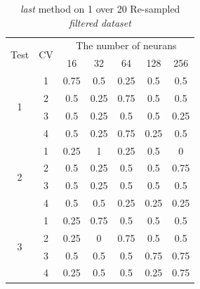 \documentclass[draft,dvipsnames]{drexel-thesis}
\begin{document}
\begin{thesis}
\begin{table}[!t]
\centering
\caption{{\em last} method on 1 over 20 Re-sampled {\em filtered dataset}}
\label{tbl:last_1_20}
\begin{tabular}{|c|c|c|c|c|c|c|}
\hline
\multirow{2}{*}{Test} & \multirow{2}{*}{CV} & \multicolumn{5}{c|}{The number of neurans}                             \\ \cline{3-7}
                      &                     & 16           & 32           & 64          & 128         & 256          \\ \hline
\multirow{4}{*}{1}    & 1                   & 0.75         & 0.5          & 0.25        & 0.5         & 0.5          \\ \cline{2-7}
                      & 2                   & 0.5          & 0.25         & 0.75        & 0.5         & 0.5          \\ \cline{2-7}
                      & 3                   & 0.5          & 0.25         & 0.5         & 0.5         & 0.25         \\ \cline{2-7}
                      & 4                   & 0.5          & 0.25         & 0.75        & 0.25        & 0.5          \\ \hline
\multirow{4}{*}{2}    & 1                   & 0.25         & 1            & 0.25        & 0.5         & 0            \\ \cline{2-7}
                      & 2                   & 0.5          & 0.25         & 0.5         & 0.5         & 0.75         \\ \cline{2-7}
                      & 3                   & 0.5          & 0.25         & 0.5         & 0.5         & 0.5          \\ \cline{2-7}
                      & 4                   & 0.5          & 0.5          & 0.25        & 0.25        & 0.25         \\ \hline
\multirow{4}{*}{3}    & 1                   & 0.25         & 0.75         & 0.5         & 0.5         & 0.5          \\ \cline{2-7}
                      & 2                   & 0.25         & 0            & 0.75        & 0.5         & 0.5          \\ \cline{2-7}
                      & 3                   & 0.5          & 0.5          & 0.5         & 0.75        & 0.75         \\ \cline{2-7}
                      & 4                   & 0.25         & 0.5          & 0.5         & 0.25        & 0.75         \\ \hline

\end{tabular}
\end{table}
\end{thesis}
\end{document}
